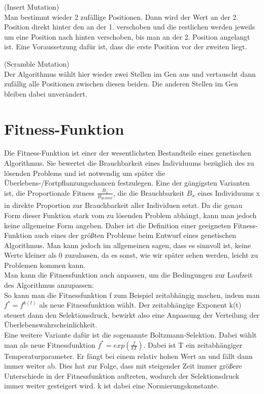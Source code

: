 \begin{algo}(Insert Mutation)\\
	Man bestimmt wieder 2 zufällige Positionen. Dann wird der Wert an der 2. Position direkt hinter den an der 1. verschoben und die restlichen werden jeweils um eine Position nach hinten verschoben, bis man an der 2. Position angelangt ist. Eine Voraussetzung dafür ist, dass die erste Position vor der zweiten liegt.
\end{algo}
\begin{algo}(Scramble Mutation)\\
	Der Algorithmus wählt hier wieder zwei Stellen im Gen aus und vertauscht dann zufällig alle Positionen zwischen diesen beiden. Die anderen Stellen im Gen bleiben dabei unverändert.
\end{algo}

\section{Fitness-Funktion}
Die Fitness-Funktion ist einer der wesentlichsten Bestandteile eines genetischen Algorithmus. Sie bewertet die Brauchbarkeit eines Individuums bezüglich des zu lösenden Problems und ist notwendig um später die Überlebens-/Fortpflanzungschancen festzulegen. Eine der gängigsten Varianten ist, die Proportionale Fitness $\frac{B_x}{B_{gesamt}}$, die die Brauchbarkeit $B_x$ eines Individuums x in direkte Proportion zur Brauchbarkeit aller Individuen setzt. Da die genau Form dieser Funktion stark vom zu lösenden Problem abhängt, kann man jedoch keine allgemeine Form angeben. Daher ist die Definition einer geeigneten Fitness-Funktion auch eines der größten Probleme beim Entwurf eines genetischen Algorithmus. Man kann jedoch im allgemeinen sagen, dass es sinnvoll ist, keine Werte kleiner als 0 zuzulassen, da es sonst, wie wir später sehen werden, leicht zu Problemen kommen kann.\\
Man kann die Fitnessfunktion auch anpassen, um die Bedingungen zur Laufzeit des Algorithmus anzupassen:\\
So kann man die Fitnessfunktion f zum Beispiel zeitabhängig machen, indem man $f^*=f^{k(t)}$ als neue Fitnessfunktion wählt. Der zeitabhängige Exponent k(t) steuert dann den Selektionsdruck, bewirkt also eine Anpassung der Verteilung der Überlebenswahrscheinlichkeit.\\
Eine weitere Variante dafür ist die sogenannte Boltzmann-Selektion. Dabei wählt man als neue Fitnessfunktion $f^*=exp(\frac{f}{kT})$. Dabei ist T ein zeitabhängiger Temperaturparameter. Er fängt bei einem relativ hohen Wert an und fällt dann immer weiter ab. Dies hat zur Folge, dass mit steigender Zeit immer größere Unterschiede in der Fitnessfunktion auftreten, wodurch der Selektionsdruck immer weiter gesteigert wird. k ist dabei eine Normierungskonstante.

